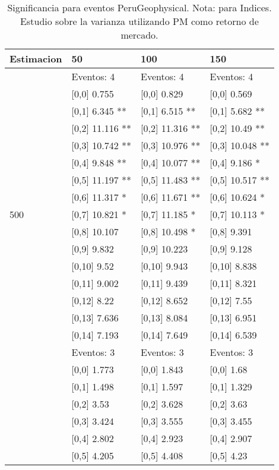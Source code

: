 \begin{table}

\caption{Significancia para eventos PeruGeophysical. Nota: para Indices. Estudio sobre la varianza utilizando PM como retorno de mercado.}
\centering
\begin{tabular}[t]{llll}
\toprule
Estimacion & 50 & 100 & 150\\
\midrule
 & Eventos:  4 & Eventos:  4 & Eventos:  4\\
 & {}[0,0] 0.755 & {}[0,0] 0.829 & {}[0,0] 0.569\\
 & {}[0,1] 6.345 ** & {}[0,1] 6.515 ** & {}[0,1] 5.682 **\\
 & {}[0,2] 11.116 ** & {}[0,2] 11.316 ** & {}[0,2] 10.49 **\\
 & {}[0,3] 10.742 ** & {}[0,3] 10.976 ** & {}[0,3] 10.048 **\\
\addlinespace
 & {}[0,4] 9.848 ** & {}[0,4] 10.077 ** & {}[0,4] 9.186 *\\
 & {}[0,5] 11.197 ** & {}[0,5] 11.483 ** & {}[0,5] 10.517 **\\
 & {}[0,6] 11.317 * & {}[0,6] 11.671 ** & {}[0,6] 10.624 *\\
500 & {}[0,7] 10.821 * & {}[0,7] 11.185 * & {}[0,7] 10.113 *\\
 & {}[0,8] 10.107 & {}[0,8] 10.498 * & {}[0,8] 9.391\\
\addlinespace
 & {}[0,9] 9.832 & {}[0,9] 10.223 & {}[0,9] 9.128\\
 & {}[0,10] 9.52 & {}[0,10] 9.943 & {}[0,10] 8.838\\
 & {}[0,11] 9.002 & {}[0,11] 9.439 & {}[0,11] 8.321\\
 & {}[0,12] 8.22 & {}[0,12] 8.652 & {}[0,12] 7.55\\
 & {}[0,13] 7.636 & {}[0,13] 8.084 & {}[0,13] 6.951\\
\addlinespace
 & {}[0,14] 7.193 & {}[0,14] 7.649 & {}[0,14] 6.539\\
 & Eventos:  3 & Eventos:  3 & Eventos:  3\\
 & {}[0,0] 1.773 & {}[0,0] 1.843 & {}[0,0] 1.68\\
 & {}[0,1] 1.498 & {}[0,1] 1.597 & {}[0,1] 1.329\\
 & {}[0,2] 3.53 & {}[0,2] 3.628 & {}[0,2] 3.63\\
\addlinespace
 & {}[0,3] 3.424 & {}[0,3] 3.555 & {}[0,3] 3.455\\
 & {}[0,4] 2.802 & {}[0,4] 2.923 & {}[0,4] 2.907\\
 & {}[0,5] 4.205 & {}[0,5] 4.408 & {}[0,5] 4.23\\

\end{tabular}
\end{table}
